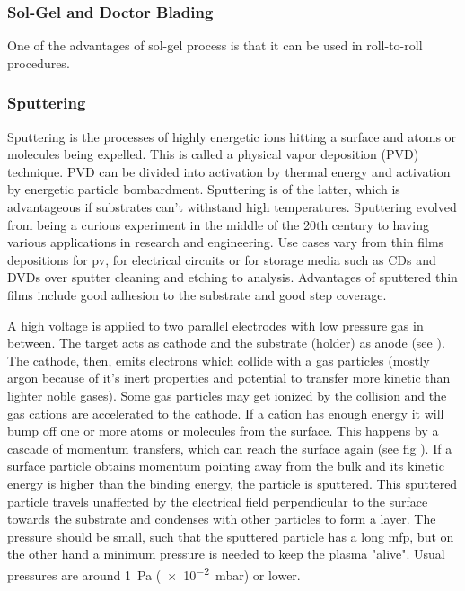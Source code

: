 \subsubsection{Sol-Gel and Doctor Blading}
One of the advantages of sol-gel process is that it can be used in roll-to-roll procedures.

\subsubsection{Sputtering}
Sputtering is the processes of highly energetic ions hitting a surface and atoms or molecules being expelled. 
This is called a physical vapor deposition (PVD) technique. 
PVD can be divided into activation by thermal energy and activation by energetic particle bombardment. 
Sputtering is of the latter, which 
is advantageous if substrates can't withstand high temperatures.
Sputtering evolved from being a curious experiment in the middle of the 20th century to having various applications in research and engineering.
Use cases vary from thin films depositions for \gls{pv}, for electrical circuits or for storage media such as CDs and DVDs 
over sputter cleaning and etching to analysis.
Advantages of 
sputtered thin films include good adhesion to the substrate and good step coverage\cite{Swann1988}.

A high voltage is applied to 
two parallel electrodes with low pressure gas in between. 
The target acts as cathode and the substrate (holder) as anode (see ).
The cathode, then, emits electrons which collide with a gas particles (mostly argon because of it's inert properties and potential to transfer more kinetic than lighter noble gases). 
Some gas particles may get ionized by the collision and the gas cations are accelerated to the cathode. 
If a cation has enough energy it will bump off one or more atoms or molecules from the surface. 
This happens by a cascade of momentum transfers, which can reach the surface again (see fig ). 
If a surface particle obtains momentum pointing away from the bulk and its kinetic energy is higher than the binding energy, the particle is sputtered. 
This sputtered particle travels unaffected by the electrical field perpendicular to the surface towards the substrate and condenses with other particles to form a layer.
The pressure should be small, such that the sputtered particle has a long \gls{mfp}, but on the other hand 
a minimum pressure is needed to keep the plasma "alive". 
Usual pressures are around \SI{1}{\Pa} (\num{e-2}\SI{}{\milli\bar}) or lower\cite{Swann1988}.

